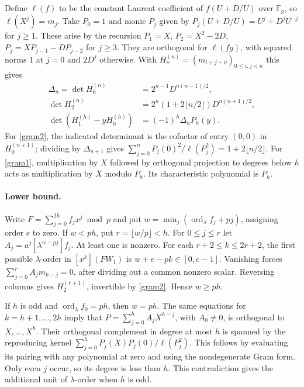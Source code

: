 \documentclass[11pt]{article}
\begin{document}
Define $\ell(f)$ to be the constant Laurent coefficient of $f(U+D/U)$
over $\mathbb F_p$, so $\ell(X^j)=m_j$. Take $P_0=1$ and monic $P_j$ given by
$P_j(U+D/U)=U^j+D^jU^{-j}$ for $j\ge1$. These arise by the recursion
$P_1=X$, $P_2=X^2-2D$, $P_j=XP_{j-1}-DP_{j-2}$ for $j\ge3$.
They are orthogonal for $\ell(fg)$, with squared norms $1$ at $j=0$
and $2D^j$ otherwise. With $H_\nu^{(n)}=(m_{i+j+\nu})_{0\le i,j<n}$
this gives
\begin{align}
 \Delta_n=\det H_0^{(n)}&=2^{n-1}D^{n(n-1)/2},\label{gram0}\\
 \det H_2^{(n)}&=2^n(1+2\lfloor n/2\rfloor)D^{n(n+1)/2},\label{gram2}\\
 \det(H_1^{(h)}-yH_0^{(h)})&=(-1)^h\Delta_h P_h(y).\label{gram1}
\end{align}
For \eqref{gram2}, the indicated determinant is the cofactor of
entry $(0,0)$ in $H_0^{(n+1)}$; dividing by $\Delta_{n+1}$ gives
$\sum_{j=0}^nP_j(0)^2/\ell(P_j^2)=1+2\lfloor n/2\rfloor$.
For \eqref{gram1}, multiplication by $X$ followed by orthogonal
projection to degrees below $h$ acts as multiplication by $X$
modulo $P_h$. Its characteristic polynomial is $P_h$.

\paragraph{Lower bound.}
Write $F=\sum_{j=0}^{2h} f_jx^j\bmod p$ and put
$w=\min_j(\operatorname{ord}_{\lambda} f_j+pj)$, assigning order $e$ to zero.
If $w<ph$, put $r=\lfloor w/p\rfloor<h$. For $0\le j\le r$ let
$A_j=a^j[\lambda^{w-pj}]f_j$. At least one is nonzero.
For each $r+2\le k\le2r+2$, the first possible $\lambda$-order
in $[x^k](FW_1)$ is $w+e-pk\in[0,e-1]$. Vanishing forces
$\sum_{j=0}^r A_jm_{k-j}=0$, after dividing out a common nonzero
scalar. Reversing columns gives $H_2^{(r+1)}$, invertible by
\eqref{gram2}. Hence $w\ge ph$.

If $h$ is odd and $\operatorname{ord}_{\lambda} f_0=ph$, then $w=ph$. The same equations for
$k=h+1,\ldots,2h$ imply that $P=\sum_{j=0}^hA_jX^{h-j}$, with
$A_0\ne0$, is orthogonal to $X,\ldots,X^h$. Their orthogonal
complement in degree at most $h$ is spanned by the reproducing
kernel $\sum_{j=0}^hP_j(X)P_j(0)/\ell(P_j^2)$. This follows by
evaluating its pairing with any polynomial at zero and using the
nondegenerate Gram form. Only even $j$ occur, so its degree is
less than $h$. This contradiction gives the additional unit of
$\lambda$-order when $h$ is odd.
\end{document}

